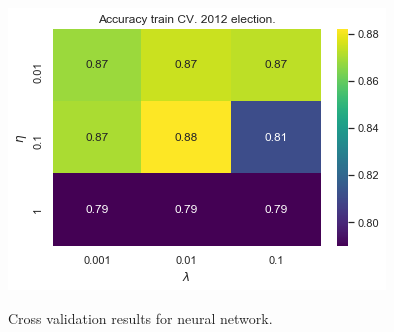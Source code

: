 \begin{figure}[H]
\centering
{\includegraphics[scale=0.33]{pictures/results/BNN_Accuracy_train_CV.png}\label{fig:f3}}
\caption{Cross validation results for neural network.}
\end{figure}
